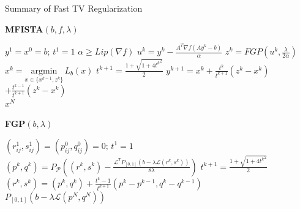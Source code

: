 \documentclass[12pt]{beamer}
\begin{document}
\begin{frame}{Summary of Fast TV Regularization}
\begin{spacing}{1.6}
\fontsize{9}{10}\selectfont
\hspace{-3 mm}
\begin{minipage}{0.4\textwidth}
\textbf{MFISTA$(b,f, \lambda)$}
\begin{algorithmic}
\State $y^1 = x^0 = b; \, t^1 = 1$
\State $\alpha \geq Lip(\nabla f)$
	\State $u^k = y^k - \frac{A^T\nabla f (A y^k - b)}{\alpha}$
	\State $z^k = FGP(u^k, \frac{\lambda}{2 \alpha})$
	\State $x^k = \underset{x \in \{x^{k-1},z^k\}}{\text{argmin}} \,L_b(x)$
	\State $t^{k+1} = \frac{1 + \sqrt{1 + 4{t^k}^2}}{2}$ 
	\State $y^{k+1} = x^k + \frac{t^k}{t^{k+1}}(z^k - x^k)$ 
	\State \hspace{10 mm}$+ \frac{t^{k-1}}{t^{k+1}}(z^k - x^k) $
\EndFor\\
\Return $x^N$
\end{algorithmic}
\end{minipage}
\begin{minipage}{0.6\textwidth}

\textbf{FGP$(b, \lambda)$}
\begin{algorithmic}
\State $(r_{ij}^1, s_{ij}^1) = (p_{ij}^0, q_{ij}^0) = 0; \, t^1 = 1$
	\State $(p^k,q^k) = P_\mathcal{P} \left( (r^k,s^k) - \frac{\mathcal{L}^TP_{[0,1]} (b - \lambda \mathcal{L}(r^k,s^k))}{8\lambda} \right)$
	\State $t^{k+1} = \frac{1 + \sqrt{1 + 4{t^k}^2}}{2}$ 
	\State $(r^k,s^k) = (p^k,q^k) + \frac{t^k-1}{t^{k+1}}(p^k-p^{k-1}, q^k-q^{k-1})$ 
\EndFor \\
\Return $P_{[0,1]} (b - \lambda \mathcal{L}(p^N,q^N))$
\end{algorithmic}

\end{minipage}
\end{spacing}
\end{frame}
\end{document}
